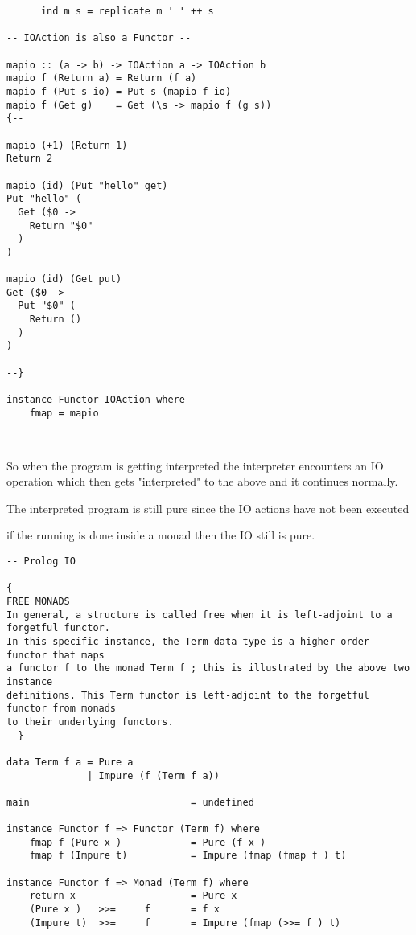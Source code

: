\documentclass[thesis-solanki.tex]{subfiles}
\begin{document}
\begin{verbatim}
      ind m s = replicate m ' ' ++ s

-- IOAction is also a Functor --

mapio :: (a -> b) -> IOAction a -> IOAction b
mapio f (Return a) = Return (f a)
mapio f (Put s io) = Put s (mapio f io)
mapio f (Get g)    = Get (\s -> mapio f (g s))
{--

mapio (+1) (Return 1)
Return 2

mapio (id) (Put "hello" get)
Put "hello" (
  Get ($0 -> 
    Return "$0"
  )
)

mapio (id) (Get put)
Get ($0 -> 
  Put "$0" (
    Return ()
  )
)

--}

instance Functor IOAction where
    fmap = mapio



\end{verbatim}

So when the program is getting interpreted the interpreter encounters an IO operation which then gets "interpreted" to the above and it 
continues normally.

The interpreted program is still pure since the IO actions have not been executed 

if the running is done inside a monad then the IO still is pure.

\begin{verbatim}
-- Prolog IO

{--
FREE MONADS
In general, a structure is called free when it is left-adjoint to a forgetful functor.
In this specific instance, the Term data type is a higher-order functor that maps
a functor f to the monad Term f ; this is illustrated by the above two instance
definitions. This Term functor is left-adjoint to the forgetful functor from monads
to their underlying functors.
--}

data Term f a = Pure a 
			  | Impure (f (Term f a))

main 							= undefined

instance Functor f => Functor (Term f) where
	fmap f (Pure x ) 			= Pure (f x )
	fmap f (Impure t) 			= Impure (fmap (fmap f ) t)

instance Functor f => Monad (Term f) where
	return x 					= Pure x
	(Pure x ) 	>>= 	f 		= f x
	(Impure t) 	>>= 	f 		= Impure (fmap (>>= f ) t)

\end{verbatim}
\end{document}
